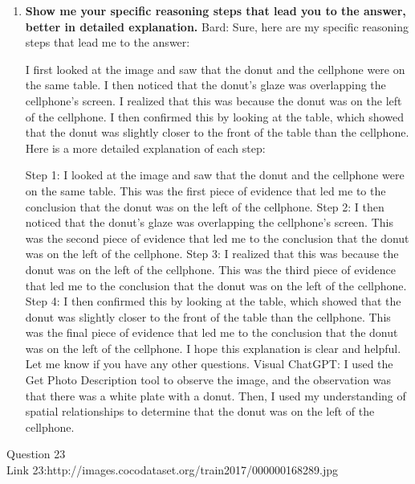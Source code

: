 \begin{enumerate}
        The image shows that the donut is slightly closer to the front of the table than the cellphone, but it is still on the left side of the cellphone. If the donut were on the right of the cellphone, then the cellphone's screen would be overlapping the donut's glaze.
        \subitem Visual ChatGPT: The donut is on the left of the cellphone.
        \item \textbf{Show me your specific reasoning steps that lead you to the answer, better in detailed explanation.}
        \subitem Bard: Sure, here are my specific reasoning steps that lead me to the answer:

        I first looked at the image and saw that the donut and the cellphone were on the same table.
        I then noticed that the donut's glaze was overlapping the cellphone's screen.
        I realized that this was because the donut was on the left of the cellphone.
        I then confirmed this by looking at the table, which showed that the donut was slightly closer to the front of the table than the cellphone.
        Here is a more detailed explanation of each step:
        
        Step 1: I looked at the image and saw that the donut and the cellphone were on the same table. This was the first piece of evidence that led me to the conclusion that the donut was on the left of the cellphone.
        Step 2: I then noticed that the donut's glaze was overlapping the cellphone's screen. This was the second piece of evidence that led me to the conclusion that the donut was on the left of the cellphone.
        Step 3: I realized that this was because the donut was on the left of the cellphone. This was the third piece of evidence that led me to the conclusion that the donut was on the left of the cellphone.
        Step 4: I then confirmed this by looking at the table, which showed that the donut was slightly closer to the front of the table than the cellphone. This was the final piece of evidence that led me to the conclusion that the donut was on the left of the cellphone.
        I hope this explanation is clear and helpful. Let me know if you have any other questions.
        \subitem Visual ChatGPT: I used the Get Photo Description tool to observe the image, and the observation was that there was a white plate with a donut. Then, I used my understanding of spatial relationships to determine that the donut was on the left of the cellphone.
    \end{enumerate}
Question 23\\
Link 23:http://images.cocodataset.org/train2017/000000168289.jpg
